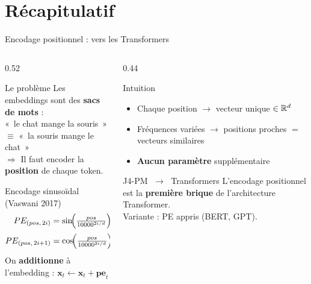 \documentclass[aspectratio=169, 10pt]{beamer}
\begin{document}
\section*{Récapitulatif}

\begin{frame}{Encodage positionnel : vers les Transformers}
  \begin{columns}[T]
    \begin{column}{0.52\textwidth}
      \begin{alertblock}{Le problème}
        Les embeddings sont des \textbf{sacs de mots} :\\[3pt]
        «~le chat mange la souris~» $\equiv$ «~la souris mange le chat~»\\[4pt]
        $\Rightarrow$ Il faut encoder la \textbf{position} de chaque token.
      \end{alertblock}
      \smallskip
      \begin{block}{Encodage sinusoïdal (Vaswani 2017)}
        \small
        \begin{align*}
          PE_{(pos,\,2i)}   &= \sin\!\Bigl(\tfrac{pos}{10000^{2i/d}}\Bigr)\\[2pt]
          PE_{(pos,\,2i+1)} &= \cos\!\Bigl(\tfrac{pos}{10000^{2i/d}}\Bigr)
        \end{align*}
        \normalsize
        On \textbf{additionne} à l'embedding : $\mathbf{x}_t \leftarrow \mathbf{x}_t + \mathbf{pe}_t$
      \end{block}
    \end{column}
    \begin{column}{0.44\textwidth}
      \begin{exampleblock}{Intuition}
        \begin{itemize}
          \item Chaque position $\to$ vecteur unique $\in \mathbb{R}^d$
          \item Fréquences variées $\to$ positions proches
                $=$ vecteurs similaires
          \item \textbf{Aucun paramètre} supplémentaire
        \end{itemize}
      \end{exampleblock}
      \vspace{4pt}
      \begin{block}{J4-PM $\;\to\;$ Transformers}
        L'encodage positionnel est la \textbf{première brique}
        de l'architecture Transformer.\\[3pt]
        Variante : PE appris (BERT, GPT).
      \end{block}
    \end{column}
  \end{columns}
\end{frame}
\end{document}
